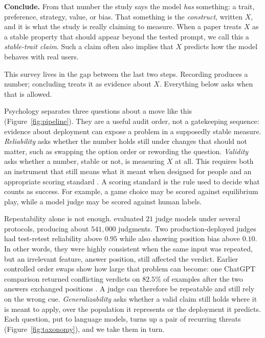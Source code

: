\documentclass[11pt]{article}
\begin{document}
\textbf{Conclude.} From that number the study says the model \emph{has}
something: a trait, preference, strategy, value, or bias. That something is the
\emph{construct}, written $X$, and it is what the study is really claiming to
measure. When a paper treats $X$ as a stable property that should appear beyond
the tested prompt, we call this a \emph{stable-trait claim}. Such a claim often
also implies that $X$ predicts how the model behaves with real users.

This survey lives in the gap between the last two steps. Recording produces a
number; concluding treats it as evidence about $X$. Everything below asks when
that is allowed.

Psychology separates three questions about a move like this
(Figure~\ref{fig:pipeline}). They are a useful audit order, not a gatekeeping
sequence: evidence about deployment can expose a problem in a supposedly stable
measure. \emph{Reliability} asks whether the number holds still under changes
that should not matter, such as swapping the option order or rewording the
question. \emph{Validity} asks whether a number, stable or not, is measuring
$X$ at all. This requires both an instrument that
still means what it meant when designed for people and an appropriate scoring
standard \cite{cronbach1955construct}. A scoring standard is the rule used to
decide what counts as success. For example, a game choice may be scored against
equilibrium play, while a model judge may be scored against human labels.

Repeatability alone is not enough. \citet{norman2026reliability} evaluated $21$
judge models under several protocols, producing about $541{,}000$ judgments.
Two production-deployed judges had test-retest reliability above $0.95$ while
also showing position bias above $0.10$. In other words, they were highly
consistent when the same input was repeated, but an irrelevant feature, answer
position, still affected the verdict. Earlier controlled order swaps show how
large that problem can become: one ChatGPT comparison returned conflicting
verdicts on $82.5\%$ of examples after the two answers exchanged positions
\cite{wang2024fair}. A judge can therefore be repeatable and still rely on the
wrong cue. \emph{Generalizability} asks whether a valid claim
still holds where it is meant to apply, over the population it represents or the
deployment it predicts. Each question, put to language models, turns up a pair of
recurring threats (Figure~\ref{fig:taxonomy}), and we take them in turn.
\end{document}
